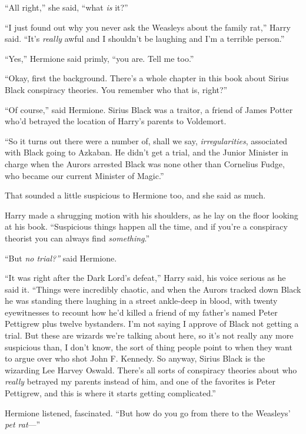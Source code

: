 ``All right,'' she said, ``what \emph{is} it?''

``I just found out why you never ask the Weasleys about the family
rat,'' Harry said. ``It's \emph{really} awful and I shouldn't be
laughing and I'm a terrible person.''

``Yes,'' Hermione said primly, ``you are. Tell me too.''

``Okay, first the background. There's a whole chapter in this book about
Sirius Black conspiracy theories. You remember who that is, right?''

``Of course,'' said Hermione. Sirius Black was a traitor, a friend of
James Potter who'd betrayed the location of Harry's parents to
Voldemort.

``So it turns out there were a number of, shall we say,
\emph{irregularities}, associated with Black going to Azkaban. He didn't
get a trial, and the Junior Minister in charge when the Aurors arrested
Black was none other than Cornelius Fudge, who became our current
Minister of Magic.''

That sounded a little suspicious to Hermione too, and she said as much.

Harry made a shrugging motion with his shoulders, as he lay on the floor
looking at his book. ``Suspicious things happen all the time, and if
you're a conspiracy theorist you can always find \emph{something}.''

``But \emph{no trial?''} said Hermione.

``It was right after the Dark Lord's defeat,'' Harry said, his voice
serious as he said it. ``Things were incredibly chaotic, and when the
Aurors tracked down Black he was standing there laughing in a street
ankle-deep in blood, with twenty eyewitnesses to recount how he'd killed
a friend of my father's named Peter Pettigrew plus twelve bystanders.
I'm not saying I approve of Black not getting a trial. But these are
wizards we're talking about here, so it's not really any more suspicious
than, I don't know, the sort of thing people point to when they want to
argue over who shot John F. Kennedy. So anyway, Sirius Black is the
wizarding Lee Harvey Oswald. There's all sorts of conspiracy theories
about who \emph{really} betrayed my parents instead of him, and one of
the favorites is Peter Pettigrew, and this is where it starts getting
complicated.''

Hermione listened, fascinated. ``But how do you go from there to the
Weasleys' \emph{pet rat}---''

